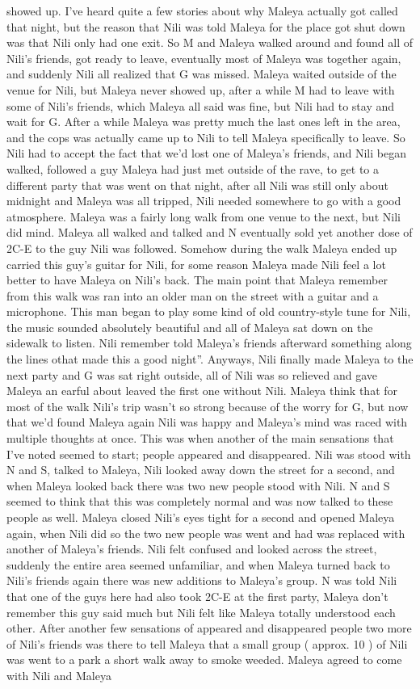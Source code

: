\documentclass[12pt]{book}
\begin{document}
showed up. I've heard quite a few stories about why Maleya actually got called that night, but the reason that Nili was told Maleya for the place got shut down was that Nili only had one exit. So M and Maleya walked around and found all of Nili's friends, got ready to leave, eventually most of Maleya was together again, and suddenly Nili all realized that G was missed. Maleya waited outside of the venue for Nili, but Maleya never showed up, after a while M had to leave with some of Nili's friends, which Maleya all said was fine, but Nili had to stay and wait for G. After a while Maleya was pretty much the last ones left in the area, and the cops was actually came up to Nili to tell Maleya specifically to leave. So Nili had to accept the fact that we'd lost one of Maleya's friends, and Nili began walked, followed a guy Maleya had just met outside of the rave, to get to a different party that was went on that night, after all Nili was still only about midnight and Maleya was all tripped, Nili needed somewhere to go with a good atmosphere. Maleya was a fairly long walk from one venue to the next, but Nili did mind. Maleya all walked and talked and N eventually sold yet another dose of 2C-E to the guy Nili was followed. Somehow during the walk Maleya ended up carried this guy's guitar for Nili, for some reason Maleya made Nili feel a lot better to have Maleya on Nili's back. The main point that Maleya remember from this walk was ran into an older man on the street with a guitar and a microphone. This man began to play some kind of old country-style tune for Nili, the music sounded absolutely beautiful and all of Maleya sat down on the sidewalk to listen. Nili remember told Maleya's friends afterward something along the lines othat made this a good night''. Anyways, Nili finally made Maleya to the next party and G was sat right outside, all of Nili was so relieved and gave Maleya an earful about leaved the first one without Nili. Maleya think that for most of the walk Nili's trip wasn't so strong because of the worry for G, but now that we'd found Maleya again Nili was happy and Maleya's mind was raced with multiple thoughts at once. This was when another of the main sensations that I've noted seemed to start; people appeared and disappeared. Nili was stood with N and S, talked to Maleya, Nili looked away down the street for a second, and when Maleya looked back there was two new people stood with Nili. N and S seemed to think that this was completely normal and was now talked to these people as well. Maleya closed Nili's eyes tight for a second and opened Maleya again, when Nili did so the two new people was went and had was replaced with another of Maleya's friends. Nili felt confused and looked across the street, suddenly the entire area seemed unfamiliar, and when Maleya turned back to Nili's friends again there was new additions to Maleya's group. N was told Nili that one of the guys here had also took 2C-E at the first party, Maleya don't remember this guy said much but Nili felt like Maleya totally understood each other. After another few sensations of appeared and disappeared people two more of Nili's friends was there to tell Maleya that a small group ( approx. 10 ) of Nili was went to a park a short walk away to smoke weeded. Maleya agreed to come with Nili and Maleya 
\end{document}
